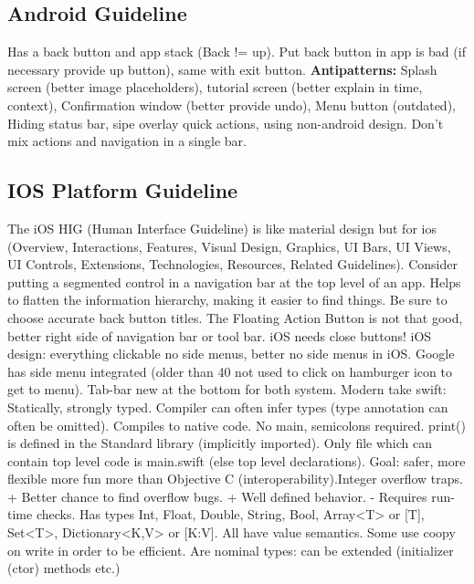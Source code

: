 \subsection{Android Guideline}
Has a back button and app stack (Back != up).
Put back button in app is bad (if necessary provide up button), same with exit button.
\textbf{Antipatterns:} Splash screen (better image placeholders), tutorial screen (better explain in time, context), Confirmation window (better provide undo), Menu button (outdated), Hiding status bar, sipe overlay quick actions, using non-android design. Don't mix actions and navigation in a single bar.

\subsection{IOS Platform Guideline}
The iOS HIG (Human Interface Guideline) is like material design but for ios (Overview, Interactions, Features, Visual Design, Graphics, UI Bars, UI Views, UI Controls, Extensions, Technologies, Resources, Related Guidelines). Consider putting a segmented control in a navigation bar at the top level of an app. Helps to flatten the information hierarchy, making it easier to find things. Be sure to choose accurate back button titles. The Floating Action Button is not that good, better right side of navigation bar or tool bar. iOS needs close buttons! iOS design: everything clickable no side menus, better no side menus in iOS. Google has side menu integrated (older than 40 not used to click on hamburger icon to get to menu). Tab-bar new at the bottom for both system.
Modern take swift: Statically, strongly typed. Compiler can often infer types (type annotation can often be omitted). Compiles to native code. No main, semicolons required. print() is defined in the Standard library (implicitly imported). Only file which can contain top level code is main.swift (else top level declarations). Goal: safer, more flexible more fun more than Objective C (interoperability).Integer overflow traps. + Better chance to find overflow bugs. + Well defined behavior. - Requires run-time checks. Has types Int, Float, Double, String, Bool, Array<T> or [T], Set<T>, Dictionary<K,V> or [K:V]. All have value semantics. Some use coopy on write in order to be efficient. Are nominal types: can be extended (initializer (ctor) methods etc.) 

